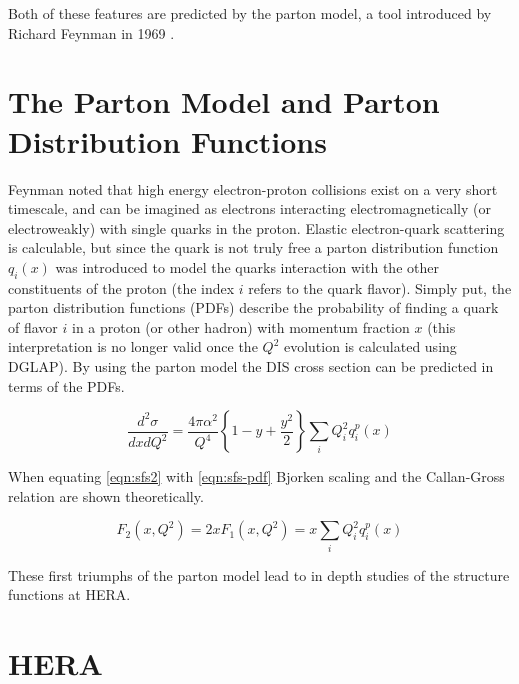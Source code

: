 Both of these features are predicted by the parton model, a tool introduced by Richard Feynman in 1969 \cite{history-feynman:1969}.

\section{The Parton Model and Parton Distribution Functions}
Feynman noted that high energy electron-proton collisions exist on a very short timescale, and can be imagined as electrons interacting electromagnetically (or electroweakly) with single quarks in the proton.  Elastic electron-quark scattering is calculable, but since the quark is not truly free a parton distribution function $q_i(x)$ was introduced to model the quarks interaction with the other constituents of the proton (the index $i$ refers to the quark flavor).  Simply put, the parton distribution functions (PDFs) describe the probability of finding a quark of flavor $i$ in a proton (or other hadron) with momentum fraction $x$ (this interpretation is no longer valid once the $Q^2$ evolution is calculated using DGLAP).  By using the parton model the DIS cross section can be predicted in terms of the PDFs.    

\begin{equation}
	\label{eqn:sfs-pdf}
	\frac{d^2\sigma}{dx dQ^2} = \frac{4 \pi \alpha^2}{Q^4} \left\lbrace 1 - y + \frac{y^2}{2} \right\rbrace \sum_{i} Q_i^2 q_i^p (x)
\end{equation}

When equating \ref{eqn:sfs2} with \ref{eqn:sfs-pdf} Bjorken scaling and the Callan-Gross relation are shown theoretically.

\begin{equation}
	\label{eqn:bjorken-scaling}
	F_{2} (x, Q^2) = 2xF_1 (x, Q^2) = x \sum_{i} Q_i^2 q_i^p(x)
\end{equation}

These first triumphs of the parton model lead to in depth studies of the structure functions at HERA.

\section{HERA}

